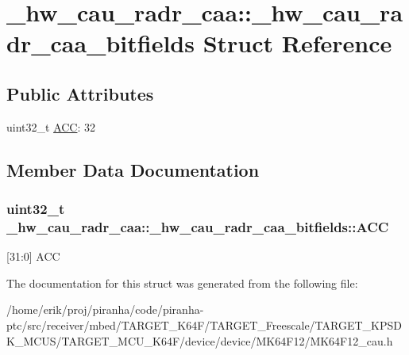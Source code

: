 \hypertarget{struct__hw__cau__radr__caa_1_1__hw__cau__radr__caa__bitfields}{}\section{\+\_\+hw\+\_\+cau\+\_\+radr\+\_\+caa\+:\+:\+\_\+hw\+\_\+cau\+\_\+radr\+\_\+caa\+\_\+bitfields Struct Reference}
\label{struct__hw__cau__radr__caa_1_1__hw__cau__radr__caa__bitfields}
\subsection*{Public Attributes}
\begin{DoxyCompactItemize}
\item 
uint32\+\_\+t \hyperlink{struct__hw__cau__radr__caa_1_1__hw__cau__radr__caa__bitfields_a743a3188d82ccc8cf251d27b5c914799}{A\+CC}\+: 32
\end{DoxyCompactItemize}


\subsection{Member Data Documentation}
\subsubsection[{\texorpdfstring{A\+CC}{ACC}}]{\setlength{\rightskip}{0pt plus 5cm}uint32\+\_\+t \+\_\+hw\+\_\+cau\+\_\+radr\+\_\+caa\+::\+\_\+hw\+\_\+cau\+\_\+radr\+\_\+caa\+\_\+bitfields\+::\+A\+CC}\hypertarget{struct__hw__cau__radr__caa_1_1__hw__cau__radr__caa__bitfields_a743a3188d82ccc8cf251d27b5c914799}{}\label{struct__hw__cau__radr__caa_1_1__hw__cau__radr__caa__bitfields_a743a3188d82ccc8cf251d27b5c914799}
\mbox{[}31\+:0\mbox{]} A\+CC 

The documentation for this struct was generated from the following file\+:\begin{DoxyCompactItemize}
\item 
/home/erik/proj/piranha/code/piranha-\/ptc/src/receiver/mbed/\+T\+A\+R\+G\+E\+T\+\_\+\+K64\+F/\+T\+A\+R\+G\+E\+T\+\_\+\+Freescale/\+T\+A\+R\+G\+E\+T\+\_\+\+K\+P\+S\+D\+K\+\_\+\+M\+C\+U\+S/\+T\+A\+R\+G\+E\+T\+\_\+\+M\+C\+U\+\_\+\+K64\+F/device/device/\+M\+K64\+F12/M\+K64\+F12\+\_\+cau.\+h\end{DoxyCompactItemize}
